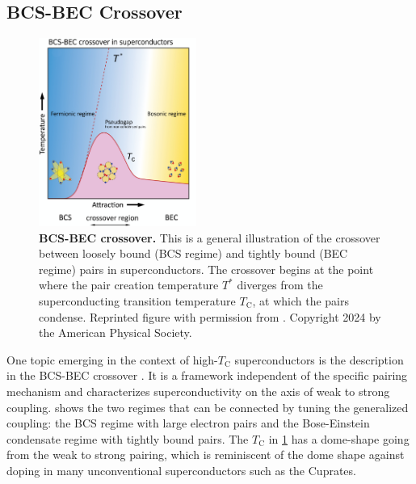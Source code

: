 \documentclass[../main.tex]{subfiles}
\begin{document}
\subsection*{BCS-BEC Crossover}

\begin{figure}
	\centering
	\includegraphics[width=0.46\textwidth]{images/BCS-BEC crossover.png}
	\caption[BCS-BEC crossover.]{
		\textbf{BCS-BEC crossover.} This is a general illustration of the crossover between loosely bound (BCS regime) and tightly bound (BEC regime) pairs in superconductors. 
		The crossover begins at the point where the pair creation temperature \(T^*\) diverges from the superconducting transition temperature \(T_{\mathrm{C}}\), at which the pairs condense.
		Reprinted figure with permission from \cite{chenWhenSuperconductivityCrosses2024}. Copyright 2024 by the American Physical Society.}
	\label{fig:BCS-BEC-crossover}
\end{figure}
One topic emerging in the context of high-\(T_{\mathrm{C}}\) superconductors is the description in the BCS-BEC crossover \cite{chenWhenSuperconductivityCrosses2024}.
It is a framework independent of the specific pairing mechanism and characterizes superconductivity on the axis of weak to strong coupling.
 shows the two regimes that can be connected by tuning the generalized coupling: the BCS regime with large electron pairs and the Bose-Einstein condensate regime with tightly bound pairs.
The \(T_{\mathrm{C}}\) in \cref{fig:BCS-BEC-crossover} has a dome-shape going from the weak to strong pairing, which is reminiscent of the dome shape against doping in many unconventional superconductors such as the Cuprates.
\end{document}
